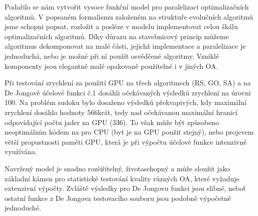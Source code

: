 
Podařilo se nám vytvořit vysoce funkční model pro paralelizaci optimalizačních algoritmů. V popsaném formalismu založeném na struktuře evolučních algoritmů jsme schopni popsat, rozložit a posléze v modelu implementovat celou škálu optimalizačních algoritmů. Díky důrazu na stavebnicový princip můžeme algoritmus dekomponovat na malé části, jejichž implementace a paralelizace je jednoduchá, nebo je možné při ní použít osvědčené algoritmy. Vzniklé komponenty jsou elegantně malé opakovaně použitelné i v jiných OA.

Při testování zrychlení za použití GPU na třech algoritmech (RS, GO, SA) a na De Jongově účelové funkci č.1 dosáhli očekávaných výsledků zrychlení na úrovni 100. Na problém sudoku bylo dosaženo výsledků překvapivých, kdy maximální zrychlení dosáhlo hodnoty 566krát, tedy nad očekávanou maximální hranicí odpovídající počtu jader na GPU (336). To však může být způsobeno neoptimálním kódem na pro CPU (byť je na GPU použit stejný), nebo projevem větší propustnosti paměti GPU, která je při výpočtu účelové funkce intenzivně využívána.

Navržený model je snadno rozšiřitelný, životaschopný a může sloužit jako základní kámen pro statistické testování kvality různých OA, které vyžaduje extenzivní výpočty. Zvláště výsledky pro De Jongovu funkci jsou slibné, neboť ostatní funkce z De Jongova testovacího souboru jsou podobně výpočetně jednoduché.